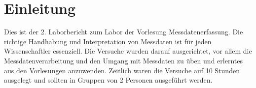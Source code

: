 \chapter{Einleitung}

Dies ist der 2. Laborbericht zum Labor der Vorlesung Messdatenerfassung.
Die richtige Handhabung und Interpretation von Messdaten ist für jeden Wissenschaftler essenziell.
Die Versuche wurden darauf ausgerichtet, vor allem die Messdatenverarbeitung
und den Umgang mit Messdaten zu üben und erlerntes aus den Vorlesungen anzuwenden. Zeitlich waren die Versuche auf 10 Stunden
ausgelegt und sollten in Gruppen von 2 Personen ausgeführt werden.  